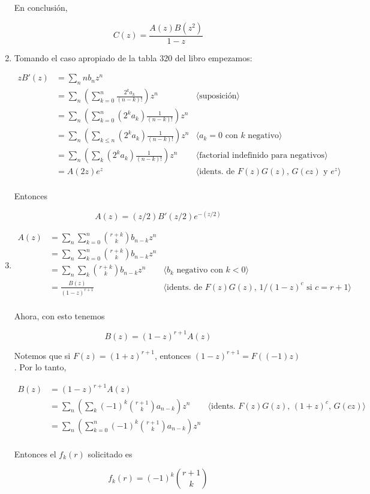 \documentclass{article}
\begin{document}
\begin{enumerate}
En conclusión,

\[
C(z) = \frac{A(z)B(z^2)}{1-z}
\]

 \item Tomando el caso apropiado de la tabla 320 del libro empezamos:

\begin{align*}
zB'(z) & = \sum_n n b_n z^n \\
       & = \sum_n \left( \sum_{k=0}^n \frac{2^k a_k}{(n-k)!} \right) z^n & \langle \text{suposición} \rangle \\
       & = \sum_n \left( \sum_{k=0}^n (2^k a_k) \frac{1}{(n-k)!} \right) z^n \\
       & = \sum_n \left( \sum_{k \leq n} (2^k a_k) \frac{1}{(n-k)!} \right) z^n
           & \langle a_k=0 \text{ con } k \text{ negativo}  \rangle \\
       & = \sum_n \left( \sum_{k} (2^k a_k) \frac{1}{(n-k)!} \right) z^n
           & \langle \text{factorial indefinido para negativos}  \rangle \\
       & = A(2z) e^z & \langle \text{idents. de } F(z)G(z) \text{, } G(cz) \text{ y } e^z \rangle \\
\end{align*}

Entonces

\[
A(z) = (z/2) B'(z/2) e^{-(z/2)}
\]

 \item 

\begin{align*}
A(z) & = \sum_n \sum_{k=0}^n \binom{r+k}{k} b_{n-k} z^n \\
     & = \sum_n \sum_{k=0}^n \binom{r+k}{k} b_{n-k} z^n \\
     & = \sum_n \sum_{k} \binom{r+k}{k} b_{n-k} z^n & \langle b_k \text{ negativo con } k < 0 \rangle \\
     & = \frac{B(z)}{(1-z)^{r+1}} & \langle \text{idents. de } F(z)G(z) \text{, } 1/(1-z)^c \text{ si } c=r+1 \rangle \\
\end{align*}

Ahora, con esto tenemos

\[
B(z) = (1-z)^{r+1} A(z)
\]

Notemos que si $F(z) = (1+z)^{r+1}$, entonces $(1-z)^{r+1} = F((-1)z)$. Por lo
tanto,

\begin{align*}
B(z) & = (1-z)^{r+1} A(z) \\
     & = \sum_n \left( \sum_k (-1)^k \binom{r+1}{k} a_{n-k} \right) z^n
         & \langle \text{idents. } F(z)G(z) \text{, } (1+z)^c \text{, } G(cz)\rangle  \\
     & = \sum_n \left( \sum_{k=0}^n (-1)^k \binom{r+1}{k} a_{n-k} \right) z^n \\
\end{align*}

Entonces el $f_k(r)$ solicitado es

\[
 f_k(r) = (-1)^k \binom{r+1}{k}
\]


\end{enumerate}
\end{document}
